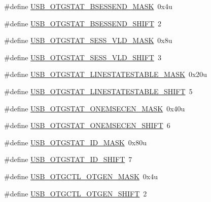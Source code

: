 \begin{DoxyCompactItemize}
\item 
\#define \hyperlink{group___u_s_b___register___masks_gabcc7c3e58301a6abc07915a5deb92d39}{U\+S\+B\+\_\+\+O\+T\+G\+S\+T\+A\+T\+\_\+\+B\+S\+E\+S\+S\+E\+N\+D\+\_\+\+M\+A\+SK}~0x4u
\item 
\#define \hyperlink{group___u_s_b___register___masks_ga6eb987e49a137057c02e8f2b26e61724}{U\+S\+B\+\_\+\+O\+T\+G\+S\+T\+A\+T\+\_\+\+B\+S\+E\+S\+S\+E\+N\+D\+\_\+\+S\+H\+I\+FT}~2
\item 
\#define \hyperlink{group___u_s_b___register___masks_ga9158e279053f0f684c33cba2ec1e68ee}{U\+S\+B\+\_\+\+O\+T\+G\+S\+T\+A\+T\+\_\+\+S\+E\+S\+S\+\_\+\+V\+L\+D\+\_\+\+M\+A\+SK}~0x8u
\item 
\#define \hyperlink{group___u_s_b___register___masks_ga69ae55ac7a03104ed013c34efa24ef43}{U\+S\+B\+\_\+\+O\+T\+G\+S\+T\+A\+T\+\_\+\+S\+E\+S\+S\+\_\+\+V\+L\+D\+\_\+\+S\+H\+I\+FT}~3
\item 
\#define \hyperlink{group___u_s_b___register___masks_ga217f22f350652ae8ad2502c2baf8440b}{U\+S\+B\+\_\+\+O\+T\+G\+S\+T\+A\+T\+\_\+\+L\+I\+N\+E\+S\+T\+A\+T\+E\+S\+T\+A\+B\+L\+E\+\_\+\+M\+A\+SK}~0x20u
\item 
\#define \hyperlink{group___u_s_b___register___masks_ga34e5a04fe2a6546a9b22a40dc1f7c543}{U\+S\+B\+\_\+\+O\+T\+G\+S\+T\+A\+T\+\_\+\+L\+I\+N\+E\+S\+T\+A\+T\+E\+S\+T\+A\+B\+L\+E\+\_\+\+S\+H\+I\+FT}~5
\item 
\#define \hyperlink{group___u_s_b___register___masks_gaf29778bce4dce2841774778e5c566bf5}{U\+S\+B\+\_\+\+O\+T\+G\+S\+T\+A\+T\+\_\+\+O\+N\+E\+M\+S\+E\+C\+E\+N\+\_\+\+M\+A\+SK}~0x40u
\item 
\#define \hyperlink{group___u_s_b___register___masks_gaac9cb5de36e29af8366533e2c05c31ac}{U\+S\+B\+\_\+\+O\+T\+G\+S\+T\+A\+T\+\_\+\+O\+N\+E\+M\+S\+E\+C\+E\+N\+\_\+\+S\+H\+I\+FT}~6
\item 
\#define \hyperlink{group___u_s_b___register___masks_gab1f78fae0de86d5ced423f41f9d6b098}{U\+S\+B\+\_\+\+O\+T\+G\+S\+T\+A\+T\+\_\+\+I\+D\+\_\+\+M\+A\+SK}~0x80u
\item 
\#define \hyperlink{group___u_s_b___register___masks_ga4f674a8a6d13daeb25950cb78cfa625c}{U\+S\+B\+\_\+\+O\+T\+G\+S\+T\+A\+T\+\_\+\+I\+D\+\_\+\+S\+H\+I\+FT}~7
\item 
\#define \hyperlink{group___u_s_b___register___masks_ga6cdb9b59615dfc774914e37d44f17e3a}{U\+S\+B\+\_\+\+O\+T\+G\+C\+T\+L\+\_\+\+O\+T\+G\+E\+N\+\_\+\+M\+A\+SK}~0x4u
\item 
\#define \hyperlink{group___u_s_b___register___masks_ga45ccee22440e024d6e6096d5607372f6}{U\+S\+B\+\_\+\+O\+T\+G\+C\+T\+L\+\_\+\+O\+T\+G\+E\+N\+\_\+\+S\+H\+I\+FT}~2

\end{DoxyCompactItemize}
